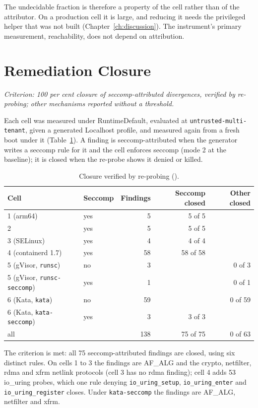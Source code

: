 The undecidable fraction is therefore a property of the cell rather than of the attributor. On a production cell it is large, and reducing it needs the privileged helper that was not built (Chapter~\ref{ch:discussion}). The instrument's primary measurement, reachability, does not depend on attribution.

\section{Remediation Closure}
\label{sec:res-closure}

\emph{Criterion: 100 per cent closure of seccomp-attributed divergences, verified by re-probing; other mechanisms reported without a threshold.}

Each cell was measured under RuntimeDefault, evaluated at \texttt{untrusted-multi-tenant}, given a generated Localhost profile, and measured again from a fresh boot under it (Table~\ref{tab:closure}). A finding is seccomp-attributed when the generator writes a seccomp rule for it and the cell enforces seccomp (mode 2 at the baseline); it is closed when the re-probe shows it denied or killed.

\begin{table}[htbp]
\centering\small
\begin{tabular}{@{}llrrr@{}}
\toprule
\textbf{Cell} & \textbf{Seccomp} & \textbf{Findings} & \textbf{Seccomp closed} & \textbf{Other closed} \\
\midrule
1 (arm64) & yes & 5 & 5 of 5 & \\
2 & yes & 5 & 5 of 5 & \\
3 (SELinux) & yes & 4 & 4 of 4 & \\
4 (containerd 1.7) & yes & 58 & 58 of 58 & \\
5 (gVisor, \texttt{runsc}) & no & 3 & & 0 of 3 \\
5 (gVisor, \texttt{runsc-seccomp}) & yes & 1 & & 0 of 1 \\
6 (Kata, \texttt{kata}) & no & 59 & & 0 of 59 \\
6 (Kata, \texttt{kata-seccomp}) & yes & 3 & 3 of 3 & \\
\midrule
all & & 138 & 75 of 75 & 0 of 63 \\
\bottomrule
\end{tabular}
\caption{Closure verified by re-probing ().}
\label{tab:closure}
\end{table}

The criterion is met: all 75 seccomp-attributed findings are closed, using six distinct rules. On cells 1 to 3 the findings are AF\_ALG and the crypto, netfilter, rdma and xfrm netlink protocols (cell 3 has no rdma finding); cell 4 adds 53 io\_uring probes, which one rule denying \texttt{io\_uring\_setup}, \texttt{io\_uring\_enter} and \texttt{io\_uring\_register} closes. Under \texttt{kata-seccomp} the findings are AF\_ALG, netfilter and xfrm.

